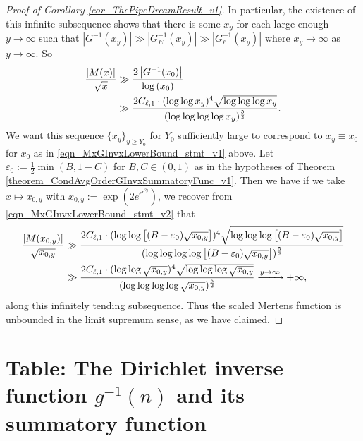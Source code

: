\documentclass[11pt,reqno,a4letter]{article}
\numberwithin{figure}{section}
\numberwithin{table}{section}
\theoremstyle{plain}
\numberwithin{theorem}{section}
\theoremstyle{definition}
\begin{document}
\begin{proof}[Proof of Corollary \ref{cor_ThePipeDreamResult_v1}]
In particular, the existence of this infinite subsequence 
shows that there is some $x_y$ for each large enough $y \rightarrow \infty$ 
such that $|G^{-1}(x_y)| \gg |G_E^{-1}(x_y)| \gg |G_{\ell}^{-1}(x_y)|$ where 
$x_y \rightarrow \infty$ as $y \rightarrow \infty$. So 
\begin{align} 
\notag 
\frac{|M(x)|}{\sqrt{x}} & \gg \frac{2 \left\lvert G^{-1}(x_0) \right\rvert}{\log\left(x_0\right)} \\ 
\label{eqn_MxGInvxLowerBound_stmt_v2} 
     & \gg \frac{2 C_{\ell,1} \cdot (\log\log x_y)^{4} \sqrt{\log\log\log x_y}}{ 
     (\log\log\log\log x_y)^{\frac{5}{2}}}. 
\end{align} 
We want this sequence $\{x_y\}_{y \geq Y_0}$ for $Y_0$ sufficiently large to correspond to 
$x_y \equiv x_0$ for $x_0$ as in \eqref{eqn_MxGInvxLowerBound_stmt_v1} above. 
Let $\varepsilon_0 := \frac{1}{2} \min(B, 1-C)$ for $B, C \in (0, 1)$ as in the hypotheses of 
Theorem \ref{theorem_CondAvgOrderGInvxSummatoryFunc_v1}. 
Then we have 
if we take $x \mapsto x_{0,y}$ with $x_{0,y} := \exp\left(2e^{e^{e^{2y}}}\right)$, 
we recover from \eqref{eqn_MxGInvxLowerBound_stmt_v2} that 
\begin{align} 
\label{eqn_MxGInvxLowerBound_stmt_v3} 
\frac{|M(x_{0,y})|}{\sqrt{x_{0,y}}} & \gg 
     \frac{2 C_{\ell,1} \cdot (\log\log \left[(B-\varepsilon_0) \sqrt{x_{0,y}}\right])^{4} 
     \sqrt{ \log\log\log \left[(B-\varepsilon_0) \sqrt{x_{0,y}}\right] } }{ 
     (\log\log\log\log \left[(B-\varepsilon_0) \sqrt{x_{0,y}}\right])^{\frac{5}{2}}} \\ 
\notag 
     & \gg 
      \frac{2 C_{\ell,1} \cdot (\log\log \sqrt{x_{0,y}})^{4} 
     \sqrt{ \log\log\log \sqrt{x_{0,y}} } }{ 
     (\log\log\log\log \sqrt{x_{0,y}})^{\frac{5}{2}}}
     \xrightarrow{y \rightarrow \infty} +\infty, 
\end{align} 
along this infinitely tending subsequence. Thus the scaled Mertens function is 
unbounded in the limit supremum sense, as we have claimed. 
\end{proof} 

\newpage 
\renewcommand{\refname}{References} 
{}


\newpage
\setcounter{section}{0} 
\renewcommand{\thesection}{T.\arabic{section}} 

\newpage
\section{Table: The Dirichlet inverse function $g^{-1}(n)$ and its summatory function} 
\label{table_conjecture_Mertens_ginvSeq_approx_values}
\end{document}
